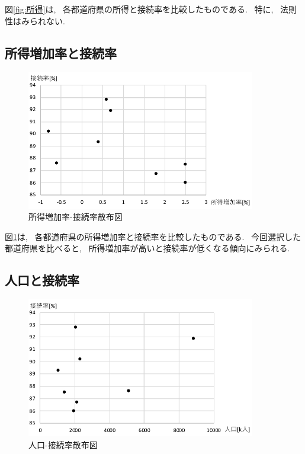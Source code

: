 \documentclass{jsarticle}
\begin{document}
        図\ref{fig:所得}は, ~各都道府県の所得と接続率を比較したものである.
        ~特に, ~法則性はみられない.

    \subsection{所得増加率と接続率}
        \begin{figure}[ht]
            \begin{center}
                \includegraphics[width=10cm]{syotokuzouka.pdf}
                \caption{所得増加率-接続率散布図}
                \label{fig:所得増加率}
            \end{center}
        \end{figure}

        図\ref{fig:所得増加率}は, ~各都道府県の所得増加率と接続率を比較したものである.
        ~今回選択した都道府県を比べると,
        ~所得増加率が高いと接続率が低くなる傾向にみられる.

    \subsection{人口と接続率}
        \begin{figure}[ht]
            \begin{center}
                \includegraphics[width=10cm]{jinkou.pdf}
                \caption{人口-接続率散布図}
                \label{fig:人口}
            \end{center}
        \end{figure}
\end{document}

